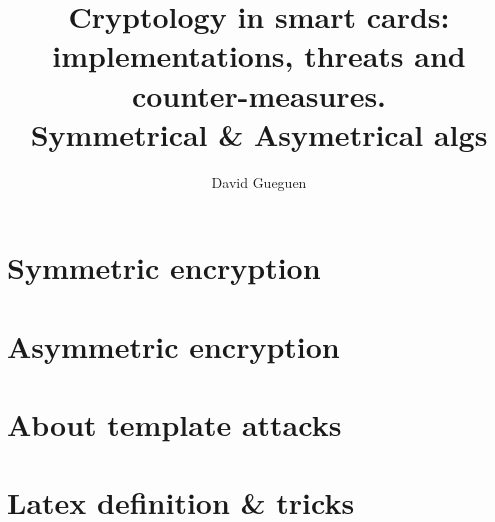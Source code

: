 \documentclass[a4paper]{report}
\author{David Gueguen}
\title{Cryptology in smart cards:\\		
		implementations, threats and counter-measures.\\
			Symmetrical \& Asymetrical algs\\						
			}
\theoremstyle{definition}
\theoremstyle{plain}
\theoremstyle{plain}
\theoremstyle{plain}
\begin{document}
	\maketitle			
	    
	    	\chapter{Symmetric encryption}	
	    		
	    			
	    		
	    		
	    			
	    			
	    			
	    	\chapter{Asymmetric encryption}
	    		
	    			
	    			
	    			
	    			
	    			
	    			
	    			
	    			
	    			
	    			
	    	\chapter{About template attacks}	
	    		
	\chapter{Latex definition \& tricks}
				
		
		
		\printindex
\end{document}
